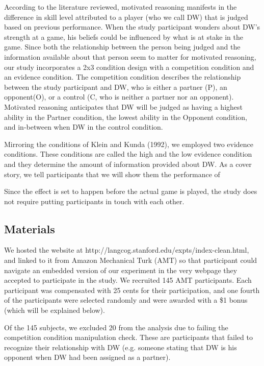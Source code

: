\documentclass{article}
\begin{document}
According to the literature reviewed, motivated reasoning manifests in the difference in skill level attributed to a player (who we call DW) that is judged based on previous performance. When the study participant wonders about DW's strength at a game, his beliefs could be influenced by what is at stake in the game. Since both the relationship between the person being judged and the information available about that person seem to matter for motivated reasoning, our study incorporates a 2x3 condition design with a competition condition and an evidence condition. The competition condition describes the relationship between the study participant and DW, who is either a partner (P), an opponent(O), or a control (C, who is neither a partner nor an opponent). Motivated reasoning anticipates that DW will be judged as having a highest ability in the Partner condition, the lowest ability in the Opponent condition, and in-between when DW in the control condition. 

Mirroring the conditions of Klein and Kunda (1992), we employed two evidence conditions. These conditions are called the high and the low evidence condition and they determine the amount of information provided about DW. As a cover story, we tell participants that we will show them the performance of

Since the effect is set to happen before the actual game is played, the study does not require putting participants in touch with each other.

\subsection{Materials}

We hosted the website at http://langcog.stanford.edu/expts/index-clean.html, and linked to it from Amazon Mechanical Turk (AMT) so that participant could navigate an embedded version of our experiment in the very webpage they accepted to participate in the study. We recruited 145 AMT participants. Each participant was compensated with 25 cents for their participation, and one fourth of the participants were selected randomly and were awarded with a \$1 bonus (which will be explained below).

Of the 145 subjects, we excluded 20 from the analysis due to failing the competition condition manipulation check. These are participants that failed to recognize their relationship with DW (e.g. someone stating that DW is his opponent when DW had been assigned as a partner).
\end{document}
